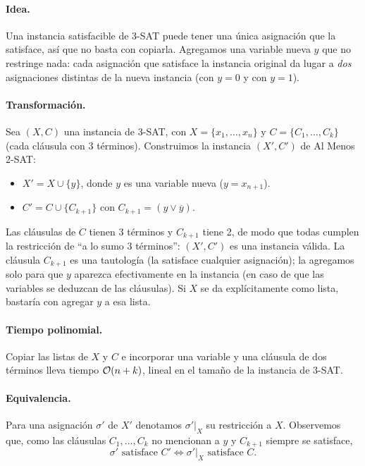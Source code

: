 
\paragraph{Idea.} Una instancia satisfacible de 3-SAT puede tener una única asignación que la satisface,
así que no basta con copiarla. Agregamos una variable nueva $y$ que no restringe nada: cada asignación
que satisface la instancia original da lugar a \emph{dos} asignaciones distintas de la nueva instancia
(con $y=0$ y con $y=1$).

\paragraph{Transformación.} Sea $(X,C)$ una instancia de 3-SAT, con $X=\{x_1,\dots,x_n\}$ y
$C=\{C_1,\dots,C_k\}$ (cada cláusula con 3 términos). Construimos la instancia $(X',C')$ de Al Menos 2-SAT:
\begin{itemize}
  \item $X' = X\cup\{y\}$, donde $y$ es una variable nueva ($y=x_{n+1}$).
  \item $C' = C\cup\{C_{k+1}\}$ con $C_{k+1} = (y\vee\overline y)$.
\end{itemize}
Las cláusulas de $C$ tienen 3 términos y $C_{k+1}$ tiene 2, de modo que todas cumplen la restricción de
``a lo sumo 3 términos'': $(X',C')$ es una instancia válida. La cláusula $C_{k+1}$ es una tautología (la
satisface cualquier asignación); la agregamos solo para que $y$ aparezca efectivamente en la instancia (en
caso de que las variables se deduzcan de las cláusulas). Si $X$ se da explícitamente como lista, bastaría con
agregar $y$ a esa lista.

\paragraph{Tiempo polinomial.} Copiar las listas de $X$ y $C$ e incorporar una variable y una cláusula de dos
términos lleva tiempo $\mathcal{O}(n+k)$, lineal en el tamaño de la instancia de 3-SAT.

\paragraph{Equivalencia.} Para una asignación $\sigma'$ de $X'$ denotamos $\sigma'|_X$ su restricción a $X$.
Observemos que, como las cláusulas $C_1,\dots,C_k$ no mencionan a $y$ y $C_{k+1}$ siempre se satisface,
\begin{equation}\label{eq:restr}
  \sigma' \text{ satisface } C' \iff \sigma'|_X \text{ satisface } C. \tag{$*$}
\end{equation}

